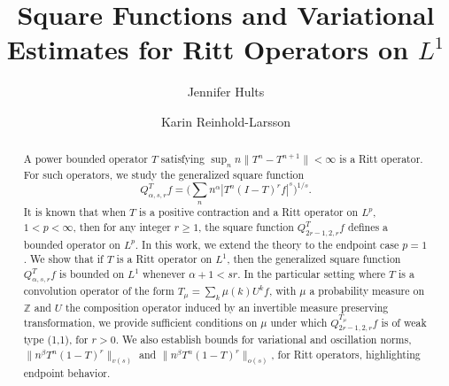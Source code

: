 \documentclass[11pt]{amsart}
\theoremstyle{definition}
\theoremstyle{remark}
\begin{document}

\title[Square Functions on $L^1$]{Square Functions and Variational Estimates for Ritt Operators on $L^1$}
 
\author[J. Hults]{Jennifer Hults}
\address{
Department of Mathematics and Statistics\\
University at Albany, SUNY, Albany, NY 12222 \\} %

\author{Karin Reinhold-Larsson } 
\address{
Department of Mathematics and Statistics\\
University at Albany, SUNY, Albany, NY 12222 } %

\date{}







\begin{abstract}
A power bounded operator $T$ satisfying  $\sup_n n\lVert T^n-T^{n+1}\rVert<\infty$  is a Ritt operator. For such operators, we study the generalized square function
\[Q_{\alpha,s,r}^Tf=\Big( \sum_n n^{\alpha} |T^n(I-T)^rf|^s \Big)^{1/s}.\]
It is known that when $T$ is a positive contraction and a Ritt operator on $L^p$, $1<p<\infty$, then for  any integer $r\ge 1$, the square function $Q_{2r-1,2,r}^Tf$
 defines a bounded operator \cite{LeMX-Vq} on $L^p$. 
  In this work, we extend the theory to the endpoint case $p=1$. We show that if $T$ is a Ritt operator on $L^1$,
 then the generalized square function
$Q_{\alpha,s,r}^Tf $ %
is bounded on $L^1$ whenever $\alpha+1<sr$. 
In the particular setting where $T$ is a convolution operator of the form
$T_{\mu}=\sum_k \mu(k) U^kf$, with $\mu$ a probability measure on $\mathbb Z$ and  $U$ the composition operator induced by an invertible measure preserving transformation, we provide sufficient conditions on $\mu$ under which  $Q_{2r-1,2,r}^{T_{\mu}}f$ is of weak type (1,1), for $r>0$. 
We also establish bounds for variational  and oscillation norms, $\lVert n^{\beta} T^n(1-T)^r\rVert_{v(s)}$ and $\lVert n^{\beta} T^n(1-T)^r\rVert_{o(s)}$, for Ritt operators, highlighting endpoint behavior.
\end{abstract}
\end{document}
